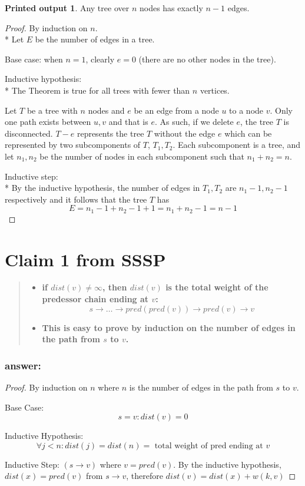 \documentclass[titlepage]{article}
\theoremstyle{definition}
\newtheorem{name}{Printed output}
\begin{document}
\newtheorem{mydef}{Theorem}

\begin{name}
  Any tree over $n$ nodes has exactly $n-1$ edges.
\end{name}


\begin{proof}
By induction on $n$. \\*
Let $E$ be the number of edges in a tree.

Base case: when $n =1$, clearly $e = 0$ (there are no other nodes in the tree).

Inductive hypothesis: \\*
The Theorem is true for all trees with fewer than $ n$ vertices.

Let $T$ be a tree with $n$ nodes and $e$ be an edge from a node $u$ to a node
$v$. Only one path exists between $u,v$ and that is $e$. As such, if we delete $e$, the
tree $T$ is disconnected. $T - e$ represents the tree $T$ without the edge $e$
which can be represented by two subcomponents of $T$, $T_1, T_2$. Each
subcomponent is a tree, and let $n_1,n_2$ be the number of nodes in each
subcomponent such that $n_1 + n_2 = n$. 

Inductive step: \\*
By the inductive hypothesis, the number of edges in $T_1, T_2$ are $n_1-1,
n_2-1$
respectively and it follows that the tree $T$ has 
\[ E = n_1 -1 + n_2 -1 +1 = n_1 + n_2-1 = n-1 \]
  \qedhere
\end{proof}


\section{Claim 1 from SSSP}
  \begin{quote}
  \begin{itemize}
    \item \textbf{if $dist(v) \neq \infty $, then $dist(v)$ is the total weight
    of the predessor chain ending at $v$:
    \[ s \rightarrow \dots \rightarrow pred(pred(v)) \rightarrow pred(v) \rightarrow v \] }
    \item \textbf{This is easy to prove by induction on the number of edges in
    the path from $s$ to $v$.}
  \end{itemize}
  \end{quote}

  \subsubsection{answer:}
    \begin{proof}
      By induction on $n$ where $n$ is the number of edges in the path from
      $s$ to $v$. 

      Base Case: 
      \[ s = v: dist(v) = 0 \]

      Inductive Hypothesis:
      \[ \forall j < n: dist(j) = dist(n) = \text{ total weight of pred ending at } v \]

      Inductive Step:
      $(s \rightarrow v)$ where $v = pred(v)$. By the inductive hypothesis,
      $dist(x) = pred(v)$ from $s \rightarrow v$, therefore $dist(v) = dist(x) +
      w(k,v)$
    \end{proof}
\end{document}
